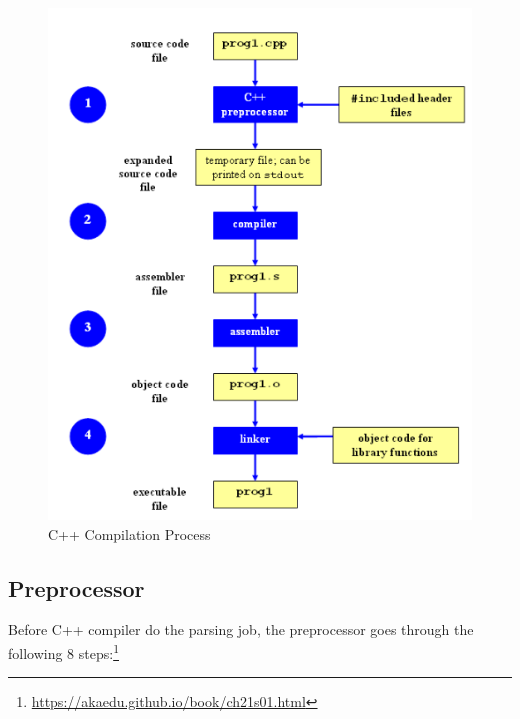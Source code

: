     \begin{figure}
         \centering
        \includegraphics[scale = 0.6]
     {Images/concepts/C++CompilationProcess.png}
        \caption[C++ Compilation Process:]%
    {C++ Compilation Process\footnotemark[\value{footnote}]}
        \label{fig:C++CompilationProcess}
    \end{figure}
    
    
    \subsection{Preprocessor}
       Before C++ compiler do the parsing job, the preprocessor goes through the following 8 steps:\footnote{\url{https://akaedu.github.io/book/ch21s01.html}} 
           

